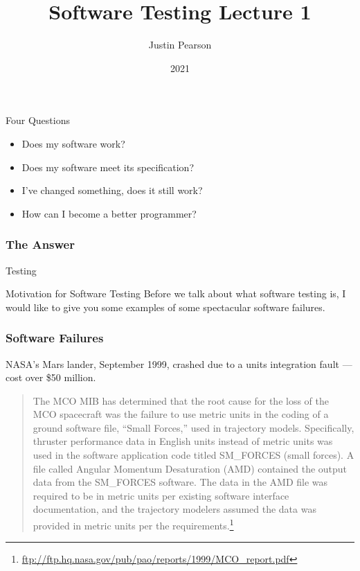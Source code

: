 \documentclass{beamer}
\title{Software Testing  Lecture 1}
\author{Justin Pearson}
\date{2021}
\begin{document}
\lstset{language=python}

\begin{frame}
  \maketitle
\end{frame}
\begin{frame}{Four Questions}
  \begin{itemize}
  \item Does my software work? \pause
  \item Does my software meet its specification? \pause
  \item I've changed something, does it still work? \pause
  \item How can I become a better programmer? 
  \end{itemize}
\end{frame}
\begin{frame}
  \frametitle{The Answer}
  \begin{center}
    {\Huge 
  Testing}
  \end{center}
\end{frame}
\begin{frame}{Motivation for Software Testing}
  Before we talk about what software testing is, I would like to give
  you some examples of some spectacular software failures.
  
  
\end{frame}
\begin{frame}
  \frametitle{Software Failures}

NASA's Mars lander, September 1999, crashed due to a units
    integration fault --- cost over  \$50 million.
    \begin{quote}
      The MCO MIB has determined that the root cause for the loss of
      the MCO spacecraft was the failure to use metric units in the
      coding of a ground software file, “Small Forces,” used in
      trajectory models. Specifically, thruster performance data in
      English units instead of metric units was used in the software
      application code titled SM\_FORCES (small forces). A file called
      Angular Momentum Desaturation (AMD) contained the output data
      from the SM\_FORCES software. The data in the AMD file was
      required to be in metric units per existing software interface
      documentation, and the trajectory modelers assumed the data was
      provided in metric units per the
      requirements.\footnote{\url{ftp://ftp.hq.nasa.gov/pub/pao/reports/1999/MCO_report.pdf}}
    \end{quote}  
\end{frame}
\end{document}
